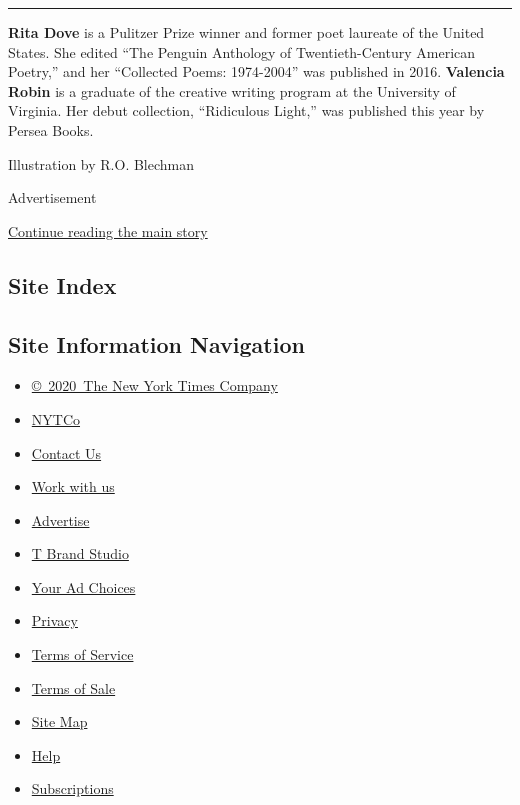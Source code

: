\begin{center}\rule{0.5\linewidth}{\linethickness}\end{center}

\textbf{Rita Dove} is a Pulitzer Prize winner and former poet laureate
of the United States. She edited ``The Penguin Anthology of
Twentieth-Century American Poetry,'' and her ``Collected Poems:
1974-2004'' was published in 2016. \textbf{Valencia Robin} is a graduate
of the creative writing program at the University of Virginia. Her debut
collection, ``Ridiculous Light,'' was published this year by Persea
Books.

Illustration by R.O. Blechman

Advertisement

\protect\hyperlink{after-bottom}{Continue reading the main story}

\hypertarget{site-index}{%
\subsection{Site Index}\label{site-index}}

\hypertarget{site-information-navigation}{%
\subsection{Site Information
Navigation}\label{site-information-navigation}}

\begin{itemize}
\tightlist
\item
  \href{https://help.nytimes3xbfgragh.onion/hc/en-us/articles/115014792127-Copyright-notice}{©~2020~The
  New York Times Company}
\end{itemize}

\begin{itemize}
\tightlist
\item
  \href{https://www.nytco.com/}{NYTCo}
\item
  \href{https://help.nytimes3xbfgragh.onion/hc/en-us/articles/115015385887-Contact-Us}{Contact
  Us}
\item
  \href{https://www.nytco.com/careers/}{Work with us}
\item
  \href{https://nytmediakit.com/}{Advertise}
\item
  \href{http://www.tbrandstudio.com/}{T Brand Studio}
\item
  \href{https://www.nytimes3xbfgragh.onion/privacy/cookie-policy\#how-do-i-manage-trackers}{Your
  Ad Choices}
\item
  \href{https://www.nytimes3xbfgragh.onion/privacy}{Privacy}
\item
  \href{https://help.nytimes3xbfgragh.onion/hc/en-us/articles/115014893428-Terms-of-service}{Terms
  of Service}
\item
  \href{https://help.nytimes3xbfgragh.onion/hc/en-us/articles/115014893968-Terms-of-sale}{Terms
  of Sale}
\item
  \href{https://spiderbites.nytimes3xbfgragh.onion}{Site Map}
\item
  \href{https://help.nytimes3xbfgragh.onion/hc/en-us}{Help}
\item
  \href{https://www.nytimes3xbfgragh.onion/subscription?campaignId=37WXW}{Subscriptions}
\end{itemize}
